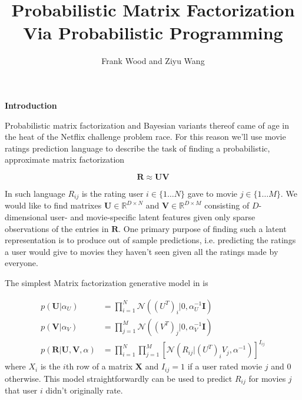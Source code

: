 \documentclass[11pt,reqno]{amsart}
\title{Probabilistic Matrix Factorization \\ Via Probabilistic Programming}
\author{Frank Wood and Ziyu Wang}
\newcommand{\+}[1]{\ensuremath{{\mathbf{#1}}}}
\begin{document}
\maketitle


{\bf Introduction}
\vspace{.5cm}

Probabilistic matrix factorization and Bayesian variants thereof came of age in the heat of the Netflix challenge problem  race.  For this reason we'll use movie ratings prediction language to describe the task of finding a probabilistic, approximate matrix factorization 

\[ \mathbf{R} \approx \mathbf{U}\mathbf{V}\] 

In such language $R_{ij}$ is the rating user $i \in \{1\ldots N\}$ gave to movie $j  \in \{1\ldots M\}$.  We would like to find matrixes $\mathbf{U} \in \mathbb{R}^{D\times N}$ and $\mathbf{V} \in \mathbb{R}^{D\times M}$ consisting of $D$-dimensional user- and movie-specific latent features given only sparse observations of the entries in $\mathbf{R}.$  One primary purpose of finding such a latent representation is to produce out of sample predictions, i.e. predicting the ratings  a user would give to movies they haven't seen given all the ratings made by everyone.

The simplest Matrix factorization generative model in \cite{salakhutdinov2008bayesian} is

\begin{align}
p(\mathbf{U}|\alpha_U) &= \prod_{i=1}^N  \mathcal{N}((U^T)_i | 0, \alpha_U^{-1}\mathbf{I})\\
p(\mathbf{V}|\alpha_V) &= \prod_{j=1}^M  \mathcal{N}((V^T)_j | 0, \alpha_V^{-1}\mathbf{I})\\
p(\mathbf{R} | \mathbf{U},  \mathbf{V}, \alpha) &= \prod_{i=1}^N \prod_{j=1}^M \left[ \mathcal{N}(R_{ij} | (U^T)_iV_j, \alpha^{-1})\right]^{I_{ij}}
\end{align}
where $X_i$ is the $i$th row of a matrix $\mathbf{X}$ and $I_{ij}=1$ if a user rated movie $j$ and $0$ otherwise.
This model straightforwardly can be used to predict $R_{ij}$ for movies $j$ that user $i$ didn't originally rate.
\newline
\end{document}
